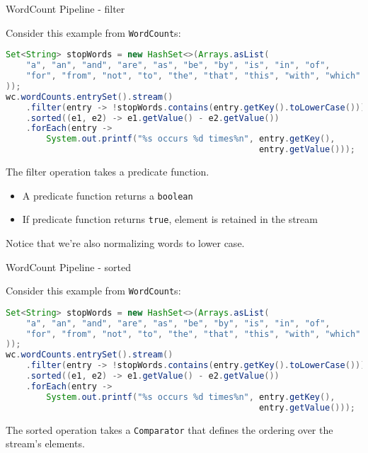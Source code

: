 \documentclass{beamer}
\begin{document}
\begin{frame}[fragile]{WordCount Pipeline - filter}

Consider this example from {\tt WordCount}s:
\begin{lstlisting}[language=Java]
Set<String> stopWords = new HashSet<>(Arrays.asList(
    "a", "an", "and", "are", "as", "be", "by", "is", "in", "of",
    "for", "from", "not", "to", "the", "that", "this", "with", "which"
));
wc.wordCounts.entrySet().stream()
    .filter(entry -> !stopWords.contains(entry.getKey().toLowerCase()))
    .sorted((e1, e2) -> e1.getValue() - e2.getValue())
    .forEach(entry ->
        System.out.printf("%s occurs %d times%n", entry.getKey(),
                                                  entry.getValue()));
\end{lstlisting}

The filter operation takes a predicate function.
\begin{itemize}
\item A predicate function returns a {\tt boolean}
\item If predicate function returns {\tt true}, element is retained in the stream
\end{itemize}
Notice that we're also normalizing words to lower case.

\end{frame}

\begin{frame}[fragile]{WordCount Pipeline - sorted}

Consider this example from {\tt WordCount}s:
\begin{lstlisting}[language=Java]
Set<String> stopWords = new HashSet<>(Arrays.asList(
    "a", "an", "and", "are", "as", "be", "by", "is", "in", "of",
    "for", "from", "not", "to", "the", "that", "this", "with", "which"
));
wc.wordCounts.entrySet().stream()
    .filter(entry -> !stopWords.contains(entry.getKey().toLowerCase()))
    .sorted((e1, e2) -> e1.getValue() - e2.getValue())
    .forEach(entry ->
        System.out.printf("%s occurs %d times%n", entry.getKey(),
                                                  entry.getValue()));
\end{lstlisting}

The sorted operation takes a {\tt Comparator} that defines the ordering over the stream's elements.

\end{frame}
\end{document}
